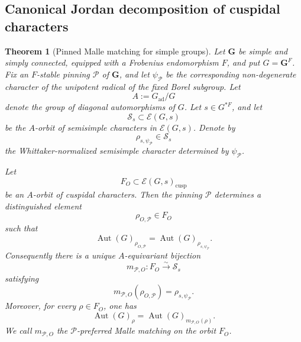 \documentclass{amsart}
\theoremstyle{plain}
\numberwithin{equation}{section}
\newtheorem{theorem}{Theorem}[section]
\theoremstyle{definition}
\newcommand{\cP}{\mathcal{P}}
\newcommand{\cE}{\mathcal{E}}
\newcommand{\ad}{\operatorname{ad}}
\newcommand{\cusp}{\operatorname{cusp}}
\newcommand{\Aut}{\operatorname{Aut}}
\begin{document}
\subsection{Canonical Jordan decomposition of cuspidal characters}
\begin{theorem}[Pinned Malle matching for simple groups]
\label{thm:pinned-Malle-matching-simple}
Let \(\mathbf G\) be simple and simply connected, equipped with a Frobenius
endomorphism \(F\), and put \(G=\mathbf G^F\).  Fix an \(F\)-stable pinning
\(\cP\) of \(\mathbf G\), and let \(\psi_{\cP}\) be the corresponding
non-degenerate character of the unipotent radical of the fixed Borel subgroup.
Let
\[
        A:=G_{\ad}/G
\]
denote the group of diagonal automorphisms of \(G\).  Let
\(s\in G^{*F}\), and let
\[
        \mathcal S_s\subset \cE(G,s)
\]
be the \(A\)-orbit of semisimple characters in \(\cE(G,s)\).  Denote by
\[
        \rho_{s,\psi_{\cP}}\in \mathcal S_s
\]
the Whittaker-normalized semisimple character determined by \(\psi_{\cP}\).

Let
\[
        F_O\subset \cE(G,s)_{\cusp}
\]
be an \(A\)-orbit of cuspidal characters.  Then the pinning \(\cP\) determines
a distinguished element
\[
        \rho_{O,\cP}\in F_O
\]
such that
\[
        \Aut(G)_{\rho_{O,\cP}}
        =
        \Aut(G)_{\rho_{s,\psi_{\cP}}}.
\]
Consequently there is a unique \(A\)-equivariant bijection
\[
        m_{\cP,O}:F_O\xrightarrow{\sim}\mathcal S_s
\]
satisfying
\[
        m_{\cP,O}(\rho_{O,\cP})=\rho_{s,\psi_{\cP}}.
\]
Moreover, for every \(\rho\in F_O\), one has
\[
        \Aut(G)_\rho
        =
        \Aut(G)_{m_{\cP,O}(\rho)}.
\]
We call \(m_{\cP,O}\) the \(\cP\)-preferred Malle matching on the orbit \(F_O\).
\end{theorem}
\end{document}
